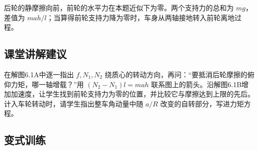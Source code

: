 \documentclass[UTF8,fontset=fandol,a4paper,11pt]{ctexart}
\begin{document}
后轮的静摩擦向前，前轮的水平力在本题近似下为零。两个支持力的总和为 $mg$，差值为 $mah/l$；当算得前轮支持力降为零时，车身从两轴接地转入前轮离地过程。



\subsection*{课堂讲解建议}

在解图6.1A中逐一指出 $f,N_1,N_2$ 绕质心的转动方向，再问：“要抵消后轮摩擦的俯仰力矩，哪一轴增载？”用 $(N_2-N_1)l=mah$ 联系图上的箭头。沿解图6.1B增加加速度，让学生找到前轮支持力为零的位置，并比较它与摩擦达到上限的先后。计入车轮转动时，请学生指出整车角动量中随 $a/R$ 改变的自转部分，写进力矩方程。




\subsection*{变式训练}
\end{document}

